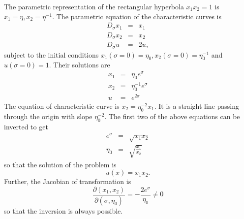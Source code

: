\documentclass{article}
\theoremstyle{plain}
\numberwithin{thm}{section}
\theoremstyle{plain}
\numberwithin{prop}{section}
\theoremstyle{definition}
\numberwithin{defn}{section}
\theoremstyle{remark}
\numberwithin{equation}{section}
\begin{document}
\begin{enumerate}
The parametric representation of the rectangular hyperbola $x_1x_2 = 1$ is $x_1 = \eta, x_2 = 
\eta^{-1}$. The parametric equation of the characteristic curves is
\begin{eqnarray}
D_\sigma x_1 &=& x_1 \label{s3e21} \\
D_\sigma x_2 &=& x_2 \label{s3e22} \\
D_\sigma u &=& 2u \label{s3e23},
\end{eqnarray}
subject to the initial conditions $x_1(\sigma = 0) = \eta_0, x_2(\sigma = 0) = \eta_0^{-1}$ and
$u(\sigma = 0) = 1$. Their solutions are
\begin{eqnarray}
x_1 &=& \eta_0 e^{\sigma} \label{s3e24} \\
x_2 &=& \eta_0^{-1} e^{\sigma} \label{s3e25} \\
u &=& e^{2\sigma} \label{s3e26}
\end{eqnarray}
The equation of characteristic curve is $x_2 = \eta_0^{-2}x_1$. It is a straight line passing
through the origin with slope $\eta_0^{-2}$. The first two of the above equations can be inverted 
to get
\begin{eqnarray}
e^\sigma &=& \sqrt{x_1x_2} \label{s3e27} \\
\eta_0 &=& \sqrt{\frac{x_1}{x_2}} \label{s3e28}
\end{eqnarray}
so that the solution of the problem is
\begin{equation}\label{s3e29}
u(x) = x_1x_2.
\end{equation}
Further, the Jacobian of transformation is
\[
\frac{\partial(x_1, x_2)}{\partial(\sigma, \eta_0)} = -\frac{2e^\sigma}{\eta_0} \ne 0
\]
so that the inversion is always possible.


\end{enumerate}
\end{document}
